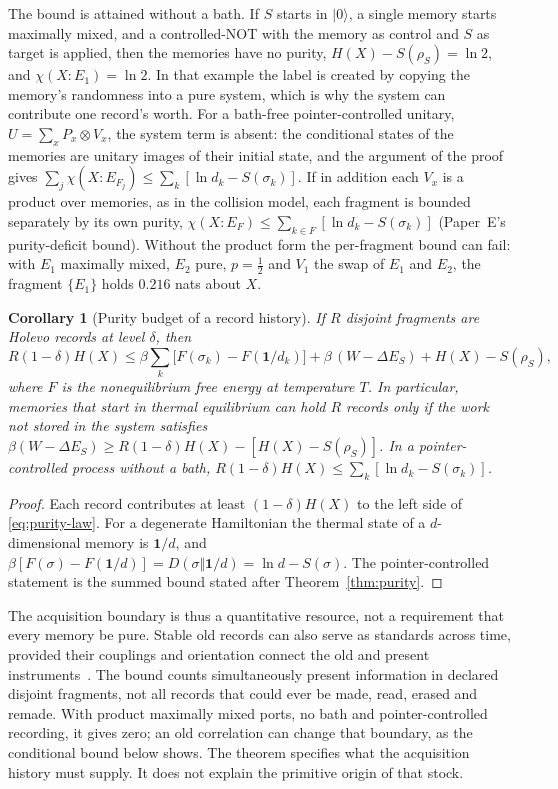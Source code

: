 \documentclass[12pt,a4paper]{article}
\newtheorem{corollary}[theorem]{Corollary}
\begin{document}
The bound is attained without a bath. If $S$ starts in $|0\rangle$, a single memory starts maximally mixed, and a controlled-NOT with the memory as control and $S$ as target is applied, then the memories have no purity, $H(X)-S(\rho_S)=\ln2$, and $\chi(X:E_1)=\ln2$. In that example the label is created by copying the memory's randomness into a pure system, which is why the system can contribute one record's worth. For a bath-free pointer-controlled unitary, $U=\sum_xP_x\otimes V_x$, the system term is absent: the conditional states of the memories are unitary images of their initial state, and the argument of the proof gives $\sum_j\chi(X:E_{F_j})\le\sum_k[\ln d_k-S(\sigma_k)]$. If in addition each $V_x$ is a product over memories, as in the collision model, each fragment is bounded separately by its own purity, $\chi(X:E_F)\le\sum_{k\in F}[\ln d_k-S(\sigma_k)]$ (Paper~E's purity-deficit bound). Without the product form the per-fragment bound can fail: with $E_1$ maximally mixed, $E_2$ pure, $p=\tfrac12$ and $V_1$ the swap of $E_1$ and $E_2$, the fragment $\{E_1\}$ holds $0.216$ nats about $X$.

\begin{corollary}[Purity budget of a record history]
\label{cor:budget}
If $R$ disjoint fragments are Holevo records at level $\delta$, then
\[
R(1-\delta)H(X)\le\beta\sum_k\bigl[F(\sigma_k)-F(\mathbf 1/d_k)\bigr]+\beta\,(W-\Delta E_S)+H(X)-S(\rho_S),
\]
where $F$ is the nonequilibrium free energy at temperature $T$. In particular, memories that start in thermal equilibrium can hold $R$ records only if the work not stored in the system satisfies $\beta(W-\Delta E_S)\ge R(1-\delta)H(X)-[H(X)-S(\rho_S)]$. In a pointer-controlled process without a bath, $R(1-\delta)H(X)\le\sum_k[\ln d_k-S(\sigma_k)]$.
\end{corollary}

\begin{proof}
Each record contributes at least $(1-\delta)H(X)$ to the left side of \eqref{eq:purity-law}. For a degenerate Hamiltonian the thermal state of a $d$-dimensional memory is $\mathbf 1/d$, and $\beta[F(\sigma)-F(\mathbf 1/d)]=D(\sigma\Vert\mathbf 1/d)=\ln d-S(\sigma)$. The pointer-controlled statement is the summed bound stated after Theorem~\ref{thm:purity}.
\end{proof}

The acquisition boundary is thus a quantitative resource, not a requirement
that every memory be pure. Stable old records can also serve as standards
across time, provided their couplings and orientation connect the old and
present instruments~\cite{Liu2026TDOME_III}. The bound counts simultaneously
present information in declared disjoint fragments, not all records that
could ever be made, read, erased and remade. With product maximally mixed
ports, no bath and pointer-controlled recording, it gives zero; an old
correlation can change that boundary, as the conditional bound below shows.
The theorem specifies what the acquisition history must supply. It does
not explain the primitive origin of that stock.
\end{document}
